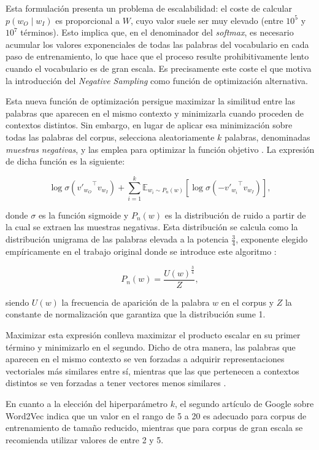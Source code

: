 Esta formulación presenta un problema de escalabilidad: el coste de calcular $p(w_O \mid w_I)$ es proporcional a $W$, cuyo valor suele ser muy elevado (entre $10^5$ y $10^7$ términos). Esto implica que, en el denominador del \textit{softmax}, es necesario acumular los valores exponenciales de todas las palabras del vocabulario en cada paso de entrenamiento, lo que hace que el proceso resulte prohibitivamente lento cuando el vocabulario es de gran escala. Es precisamente este coste el que motiva la introducción del \textit{Negative Sampling} como función de optimización alternativa.

Esta nueva función de optimización persigue maximizar la similitud entre las palabras que aparecen en el mismo contexto y minimizarla cuando proceden de contextos distintos. Sin embargo, en lugar de aplicar esa minimización sobre todas las palabras del corpus, selecciona aleatoriamente $k$ palabras, denominadas \textit{muestras negativas}, y las emplea para optimizar la función objetivo \cite{karimi_negative_sampling_baeldung_2025}. La expresión de dicha función es la siguiente:

\[
  \log \sigma\!\left({v'_{w_O}}^{\!\top} v_{w_I}\right)
  + \sum_{i=1}^{k} \mathbb{E}_{w_i \sim P_n(w)}\!\left[\log \sigma\!\left(-{v'_{w_i}}^{\!\top} v_{w_I}\right)\right],
\]

donde $\sigma$ es la función sigmoide y $P_n(w)$ es la distribución de ruido a partir de la cual se extraen las muestras negativas. Esta distribución se calcula como la distribución unigrama de las palabras elevada a la potencia $\frac{3}{4}$, exponente elegido empíricamente en el trabajo original donde se introduce este algoritmo \cite{mikolov_skipgram_phrases_2013}:

\[
  P_n(w) = \frac{U(w)^{\frac{3}{4}}}{Z},
\]

siendo $U(w)$ la frecuencia de aparición de la palabra $w$ en el corpus y $Z$ la constante de normalización que garantiza que la distribución sume 1.

Maximizar esta expresión conlleva maximizar el producto escalar en su primer término y minimizarlo en el segundo. Dicho de otra manera, las palabras que aparecen en el mismo contexto se ven forzadas a adquirir representaciones vectoriales más similares entre sí, mientras que las que pertenecen a contextos distintos se ven forzadas a tener vectores menos similares \cite{karimi_negative_sampling_baeldung_2025}.

En cuanto a la elección del hiperparámetro $k$, el segundo artículo de Google sobre Word2Vec \cite{mikolov_skipgram_phrases_2013} indica que un valor en el rango de 5 a 20 es adecuado para corpus de entrenamiento de tamaño reducido, mientras que para corpus de gran escala se recomienda utilizar valores de entre 2 y 5.

